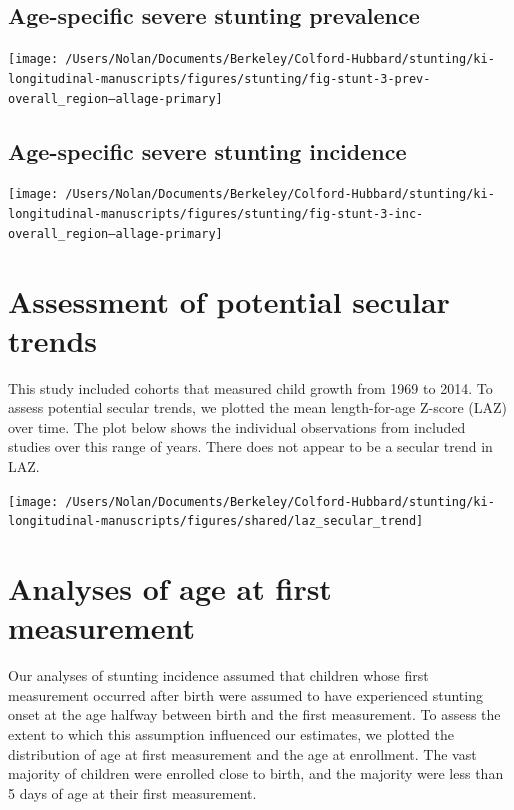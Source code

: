 \documentclass[9pt,]{book}
\begin{document}
\section{Age-specific severe stunting
prevalence}\label{age-specific-severe-stunting-prevalence}

\texttt{[image: /Users/Nolan/Documents/Berkeley/Colford-Hubbard/stunting/ki-longitudinal-manuscripts/figures/stunting/fig-stunt-3-prev-overall\_region--allage-primary]}

\section{Age-specific severe stunting
incidence}\label{age-specific-severe-stunting-incidence}

\texttt{[image: /Users/Nolan/Documents/Berkeley/Colford-Hubbard/stunting/ki-longitudinal-manuscripts/figures/stunting/fig-stunt-3-inc-overall\_region--allage-primary]}

\chapter{Assessment of potential secular trends}\label{secular-trends}

\raggedright

This study included cohorts that measured child growth from 1969 to
2014. To assess potential secular trends, we plotted the mean
length-for-age Z-score (LAZ) over time. The plot below shows the
individual observations from included studies over this range of years.
There does not appear to be a secular trend in LAZ.

\texttt{[image: /Users/Nolan/Documents/Berkeley/Colford-Hubbard/stunting/ki-longitudinal-manuscripts/figures/shared/laz\_secular\_trend]}

\chapter{Analyses of age at first measurement}\label{age-meas}

\raggedright

Our analyses of stunting incidence assumed that children whose first
measurement occurred after birth were assumed to have experienced
stunting onset at the age halfway between birth and the first
measurement. To assess the extent to which this assumption influenced
our estimates, we plotted the distribution of age at first measurement
and the age at enrollment. The vast majority of children were enrolled
close to birth, and the majority were less than 5 days of age at their
first measurement.
\end{document}
